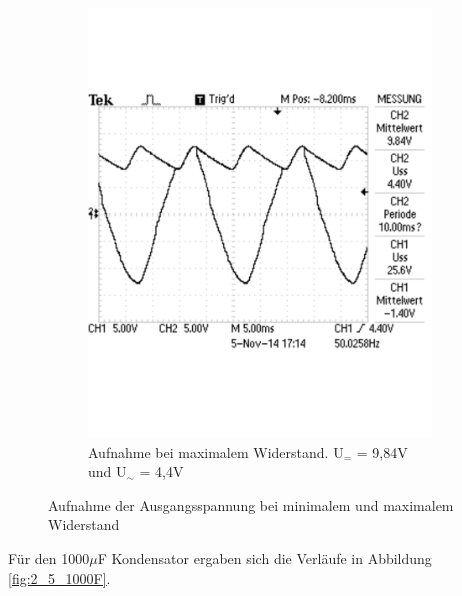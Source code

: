 \documentclass[12pt,a4paper]{article}
\begin{document}
\begin{figure}[H]
\begin{subfigure}[b]{0.48\textwidth}
                \includegraphics[width=\textwidth , scale = 0.4]{2_5_100F_2.pdf}
                \caption[Aufnahme bei maximalem Widerstand. U$_{=}$ = 9,84V und U$_\sim$ = 4,4V]{Aufnahme bei maximalem Widerstand. U$_{=}$ = 9,84V und U$_\sim$ = 4,4V}
  				\label{fig:2_5_100F_2}
        \end{subfigure}
        \caption{Aufnahme der Ausgangsspannung bei minimalem und maximalem Widerstand}
        \label{fig:2_5_100F}
\end{figure}

Für den 1000$\mu$F Kondensator ergaben sich die Verläufe in Abbildung \ref{fig:2_5_1000F}.
\end{document}
